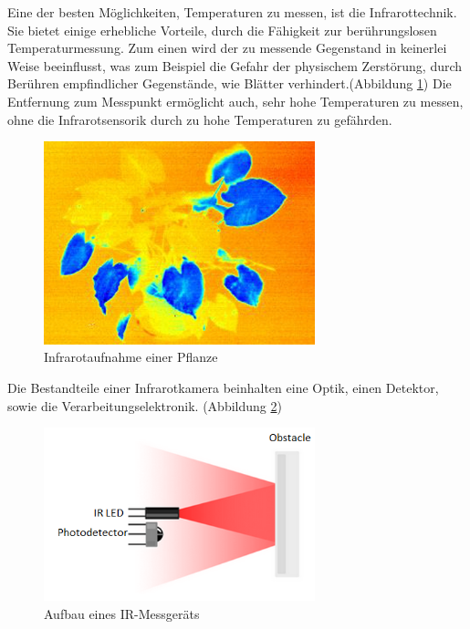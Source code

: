 Eine der besten Möglichkeiten, Temperaturen zu messen, ist die Infrarottechnik.
Sie bietet einige erhebliche Vorteile, durch die Fähigkeit zur berührungslosen
Temperaturmessung. Zum einen wird der zu messende Gegenstand in keinerlei Weise
beeinflusst, was zum Beispiel die Gefahr der physischem Zerstörung, durch
Berühren empfindlicher Gegenstände, wie Blätter verhindert.(Abbildung
\ref{fig:infrarot_pflanze}) Die Entfernung zum Messpunkt ermöglicht auch, sehr
hohe Temperaturen zu messen, ohne die Infrarotsensorik durch zu hohe
Temperaturen zu gefährden. \begin{figure}[!h]
	\centering
	\includegraphics[width=0.7\textwidth]{bilder/infrarot_pflanze.jpg}
	\caption[Infrarotaufnahme einer Pflanze]{Infrarotaufnahme einer Pflanze}
	\label{fig:infrarot_pflanze}
\end{figure}

Die Bestandteile einer Infrarotkamera beinhalten eine Optik, einen Detektor,
sowie die Verarbeitungselektronik. (Abbildung \ref{fig:aufbau infrarotsensor})
\begin{figure}[ht]
	\centering
	\includegraphics[width=0.7\textwidth]{bilder/infrarotsensor.png}
	\caption[Aufbau eines IR-Messgeräts]{Aufbau eines IR-Messgeräts}
	\label{fig:aufbau infrarotsensor}
\end{figure}

